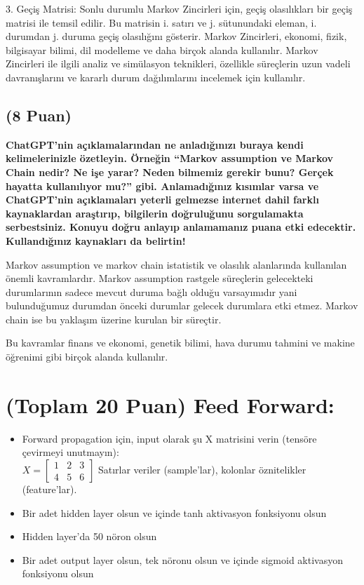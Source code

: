 \documentclass[11pt]{article}
\begin{document}
3. Geçiş Matrisi: Sonlu durumlu Markov Zincirleri için, geçiş olasılıkları bir geçiş matrisi ile temsil edilir. Bu matrisin i. satırı ve j. sütunundaki eleman, i. durumdan j. duruma geçiş olasılığını gösterir.
Markov Zincirleri, ekonomi, fizik, bilgisayar bilimi, dil modelleme ve daha birçok alanda kullanılır. Markov Zincirleri ile ilgili analiz ve simülasyon teknikleri, özellikle süreçlerin uzun vadeli davranışlarını ve kararlı durum dağılımlarını incelemek için kullanılır.



\subsection{(8 Puan)} \textbf{ChatGPT’nin açıklamalarından ne anladığınızı buraya kendi kelimelerinizle özetleyin. Örneğin ``Markov assumption ve Markov Chain nedir? Ne işe yarar? Neden bilmemiz gerekir bunu? Gerçek hayatta kullanılıyor mu?'' gibi. Anlamadığınız kısımlar varsa ve ChatGPT’nin açıklamaları yeterli gelmezse internet dahil farklı kaynaklardan araştırıp, bilgilerin doğruluğunu sorgulamakta serbestsiniz. Konuyu doğru anlayıp anlamamanız puana etki edecektir. Kullandığınız kaynakları da belirtin!}

Markov assumption ve markov chain istatistik ve olasılık alanlarında kullanılan önemli kavramlardır. Markov assumption rastgele süreçlerin gelecekteki durumlarının sadece mevcut duruma bağlı olduğu varsayımıdır yani bulunduğumuz durumdan önceki durumlar gelecek durumlara etki etmez. Markov chain ise bu yaklaşım üzerine kurulan bir süreçtir.

Bu kavramlar finans ve ekonomi, genetik bilimi, hava durumu tahmini ve makine öğrenimi gibi birçok alanda kullanılır.

\section{(Toplam 20 Puan) Feed Forward:}
 
\begin{itemize}
    \item Forward propagation için, input olarak şu X matrisini verin (tensöre çevirmeyi unutmayın):\\
    $X = \begin{bmatrix}
        1 & 2 & 3\\
        4 & 5 & 6
        \end{bmatrix}$
    Satırlar veriler (sample'lar), kolonlar öznitelikler (feature'lar).
    \item Bir adet hidden layer olsun ve içinde tanh aktivasyon fonksiyonu olsun
    \item Hidden layer'da 50 nöron olsun
    \item Bir adet output layer olsun, tek nöronu olsun ve içinde sigmoid aktivasyon fonksiyonu olsun
\end{itemize}
\end{document}
